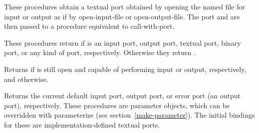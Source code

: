 \begin{entry}{%
}

These procedures obtain a
textual port obtained by opening the named file for input or output
as if by {\cf open-input-file} or {\cf open-output-file}.  
The port and  are then passed to a procedure equivalent
to {\cf call-with-port}.
\end{entry}

\begin{entry}{%
}

These procedures return \schtrue{} if  is an input port, output port, 
textual port, binary port, or any
kind of port, respectively.  Otherwise they return \schfalse.

\end{entry}


\begin{entry}{%
}

Returns \schtrue{} if  is still open and capable of
performing input or output, respectively, and \schfalse{} otherwise.


\end{entry}


\begin{entry}{%
}

Returns the current default input port, output port, or error port (an
output port), respectively.  These procedures are parameter objects, which can be
overridden with {\cf parameterize} (see
section~\ref{make-parameter}).  The initial bindings for these
are implementation-defined textual ports.

\end{entry}


